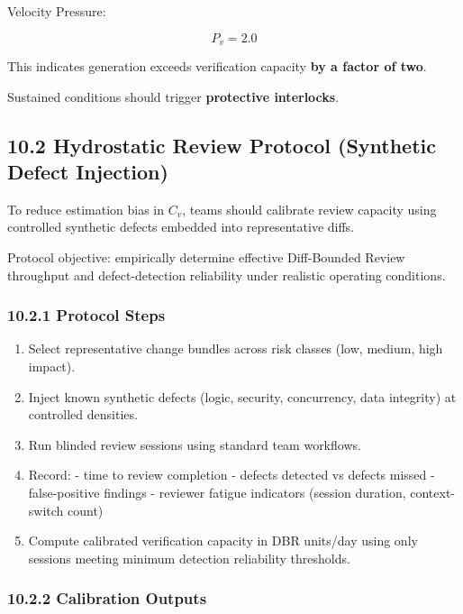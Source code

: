 \documentclass[
]{article}
\providecommand{\tightlist}{%
  \setlength{\itemsep}{0pt}\setlength{\parskip}{0pt}}
\begin{document}
Velocity Pressure:

\[
P_v = 2.0
\]

This indicates generation exceeds verification capacity \textbf{by a
factor of two}.

Sustained conditions should trigger \textbf{protective interlocks}.

\subsection{10.2 Hydrostatic Review Protocol (Synthetic Defect
Injection)}\label{102-hydrostatic-review-protocol-synthetic-defect-injection}

To reduce estimation bias in \(C_v\), teams should calibrate review
capacity using controlled synthetic defects embedded into representative
diffs.

Protocol objective: empirically determine effective Diff-Bounded Review
throughput and defect-detection reliability under realistic operating
conditions.

\subsubsection{10.2.1 Protocol Steps}\label{1021-protocol-steps}

\begin{enumerate}
\def\labelenumi{\arabic{enumi}.}
\tightlist
\item
  Select representative change bundles across risk classes (low, medium,
  high impact).
\item
  Inject known synthetic defects (logic, security, concurrency, data
  integrity) at controlled densities.
\item
  Run blinded review sessions using standard team workflows.
\item
  Record: - time to review completion - defects detected vs defects
  missed - false-positive findings - reviewer fatigue indicators
  (session duration, context-switch count)
\item
  Compute calibrated verification capacity in DBR units/day using only
  sessions meeting minimum detection reliability thresholds.
\end{enumerate}

\subsubsection{10.2.2 Calibration
Outputs}\label{1022-calibration-outputs}
\end{document}
